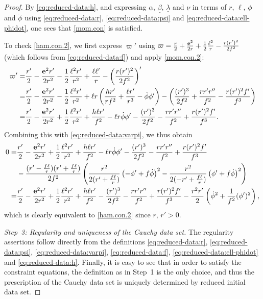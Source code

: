 \documentclass[10pt, reqno]{amsart}
\theoremstyle{definition}
\theoremstyle{remark}
\theoremstyle{conjecture}
\numberwithin{equation}{section}
\newcommand{\0}{\emptyset}
\newcommand{\alp}{\alpha}
\newcommand{\bt}{\beta}
\newcommand{\lmb}{\lambda}
\newcommand{\bfe}{{\bf e}}
\newcommand{\dur}{\nu}
\newcommand{\dvr}{\lmb}
\newcommand{\f}{\frac}
\newcommand{\pfstep}[1]{\vspace{.5em} {\it \noindent #1.}}
\newcommand{\e}{\bfe}							%
\begin{document}
\begin{proof}
By \eqref{eq:reduced-data:h}, and expressing $\underline{\alp}$, $\underline{\bt}$, $\underline{\dvr}$ and $\underline{\dur}$ in terms of $r$, $\ell$, $\phi$ and $\dot{\phi}$ using \eqref{eq:reduced-data:r}, \eqref{eq:reduced-data:psi} and \eqref{eq:reduced-data:ell-phidot}, one sees that \eqref{mom.con} is satisfied.

To check \eqref{ham.con.2}, we first express $\varpi'$ using $\varpi=\f r2+\f{\e^2}{2r}+\f 12\f{\ell^2}{r}-\f{r(r')^2}{2f^2}$ (which follows from \eqref{eq:reduced-data:f}) and apply \eqref{mom.con.2}:
\begin{equation*}
\begin{split}
\varpi'=&\f{r'}{2}-\f{\e^2 r'}{2r^2}-\f 12\f{\ell^2 r'}{r^2}+ \f{\ell \ell'}{r}-\left(\f{r(r')^2}{2f^2}\right)'\\
=&\f{r'}{2}-\f{\e^2 r'}{2r^2}-\f 12\f{\ell^2 r'}{r^2}+ \ell r\left(\f{hr'}{rf^2}+\f{\ell r'}{r^3}-\dot{\phi}\phi'\right)-\left(\f{(r')^3}{2f^2}+\f{rr'r''}{f^2}-\f{r(r')^2f'}{f^3}\right)\\
=&\f{r'}{2}-\f{\e^2 r'}{2r^2}+\f 12\f{\ell^2 r'}{r^2}+ \f{h\ell r'}{f^2}-\ell r\dot{\phi}\phi'-\f{(r')^3}{2f^2}-\f{rr'r''}{f^2}+\f{r(r')^2f'}{f^3}.
\end{split}
\end{equation*}
Combining this with \eqref{eq:reduced-data:varpi}, we thus obtain
\begin{equation*}
\begin{split}
0=&\f{r'}{2}-\f{\e^2 r'}{2r^2}+\f 12\f{\ell^2 r'}{r^2}+ \f{h\ell r'}{f^2}-\ell r\dot{\phi}\phi'-\f{(r')^3}{2f^2}-\f{rr'r''}{f^2}+\f{r(r')^2f'}{f^3}\\
&-\f{(r'-\f{f\ell}{r})(r'+\f{f\ell}{r})}{2 f^2} \left( \f {r^2}{2( r'+\f{f\ell}{r})} \left( -\phi'+f\dot{\phi} \right)^{2} - \f{r^2}{2(- r'+\f{f\ell}{r})} \left( \phi'+f\dot{\phi} \right)^{2} \right)\\
=&\f{r'}{2}-\f{\e^2 r'}{2r^2}+\f 12\f{\ell^2 r'}{r^2}+ \f{h\ell r'}{f^2}-\f{(r')^3}{2f^2}-\f{rr'r''}{f^2}+\f{r(r')^2f'}{f^3}-\f{r^2r'}{2}\left(\dot{\phi}^2+\f{1}{f^2}(\phi')^2\right),
\end{split}
\end{equation*}
which is clearly equivalent to \eqref{ham.con.2} since $r,\, r'>0$.


\pfstep{Step~3: Regularity and uniqueness of the Cauchy data set}
The regularity assertions follow directly from the definitions \eqref{eq:reduced-data:r}, \eqref{eq:reduced-data:psi}, \eqref{eq:reduced-data:varpi}, \eqref{eq:reduced-data:f}, \eqref{eq:reduced-data:ell-phidot} and \eqref{eq:reduced-data:h}. Finally, it is easy to see that in order to satisfy the constraint equations, the definition as in Step~1 is the only choice, and thus the prescription of the Cauchy data set is uniquely determined by reduced initial data set.
\qedhere
\end{proof}
\end{document}

